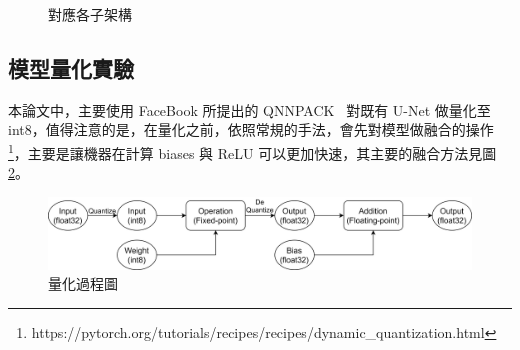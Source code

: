 \begin{figure}[htbp]
\begin{minipage}[t]{0.6\textwidth}
        \caption {對應各子架構}
        \label{MobileUnetV2_2}
    \end{minipage}
    \hfil
\end{figure}

\clearpage

\subsection{模型量化實驗}
本論文中，主要使用 FaceBook 所提出的 QNNPACK~\cite{dukhan2018qnnpack} 對既有 U-Net 做量化至 int8，值得注意的是，在量化之前，依照常規的手法，會先對模型做融合的操作\footnote{https://pytorch.org/tutorials/recipes/recipes/dynamic\_quantization.html}，主要是讓機器在計算 biases 與 ReLU 可以更加快速，其主要的融合方法見圖\ref{quantization2}。

\begin{figure}[htbp]
    \hfil
    \begin{minipage}[t]{1.0\textwidth}
        \includegraphics[width=\textwidth]{./figures/chapter04_experiment/quantization2.png}
        \caption {量化過程圖}
        \label{quantization2}
    \end{minipage}
    \hfil
\end{figure}
